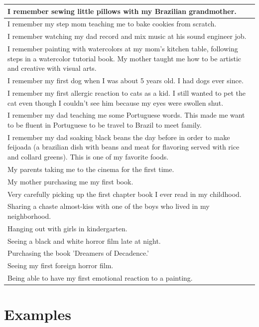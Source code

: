 \documentclass[
  .7em,
  letterpaper,
  DIV=11,
  numbers=noendperiod]{scrartcl}
\begin{document}
\begin{table}
\begin{tabular}{l}
\hline
I remember sewing little pillows with my Brazilian grandmother.\\
\hline
I remember my step mom teaching me to bake cookies from scratch.\\
\hline
I remember watching my dad record and mix music at his sound engineer job.\\
\hline
I remember painting with watercolors at my mom's kitchen table, following steps in a watercolor tutorial book. My mother taught me how to be artistic and creative with visual arts.\\
\hline
I remember my first dog when I was about 5 years old.  I had dogs ever since.\\
\hline
I remember my first allergic reaction to cats as a kid.  I still wanted to pet the cat even though I couldn't see him because my eyes were swollen shut.\\
\hline
I remember my dad teaching me some Portuguese words.  This made me want to be fluent in Portuguese to be travel to Brazil to meet family.\\
\hline
I remember my dad soaking black beans the day before in order to make feijoada (a brazilian dish with beans and meat for flavoring served with rice and collard greens). This is one of my favorite foods.\\
\hline
My parents taking me to the cinema for the first time.\\
\hline
My mother purchasing me my first book.\\
\hline
Very carefully picking up the first chapter book I ever read in my childhood.\\
\hline
Sharing a chaste almost-kiss with one of the boys who lived in my neighborhood.\\
\hline
Hanging out with girls in kindergarten.\\
\hline
Seeing a black and white horror film late at night.\\
\hline
Purchasing the book 'Dreamers of Decadence.'\\
\hline
Seeing my first foreign horror film.\\
\hline
Being able to have my first emotional reaction to a painting.\\
\hline
\end{tabular}
\end{table}

\hypertarget{examples}{%
\section{Examples}\label{examples}}
\end{document}
